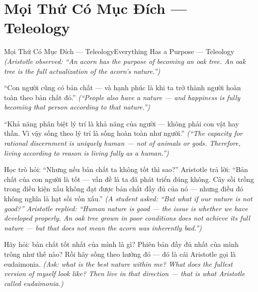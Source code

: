 \section{Mọi Thứ Có Mục Đích — Teleology}
\begin{truyen}{Mọi Thứ Có Mục Đích — Teleology}{Everything Has a Purpose — Teleology}
\textit{(Aristotle observed: ``An acorn has the purpose of becoming an oak tree. An oak tree is the full actualization of the acorn's nature.'')}

``Con người cũng có bản chất — và hạnh phúc là khi ta trở thành người hoàn toàn theo bản chất đó.''
\textit{(``People also have a nature — and happiness is fully becoming that person according to that nature.'')}

``Khả năng phân biệt lý trí là khả năng của người — không phải con vật hay thần. Vì vậy sống theo lý trí là sống hoàn toàn như người.''
\textit{(``The capacity for rational discernment is uniquely human — not of animals or gods. Therefore, living according to reason is living fully as a human.'')}

Học trò hỏi: ``Nhưng nếu bản chất ta không tốt thì sao?'' Aristotle trả lời: ``Bản chất của con người là tốt — vấn đề là ta đã phát triển đúng không. Cây sồi trồng trong điều kiện xấu không đạt được bản chất đầy đủ của nó — nhưng điều đó không nghĩa là hạt sồi vốn xấu.''
\textit{(A student asked: ``But what if our nature is not good?'' Aristotle replied: ``Human nature is good — the issue is whether we have developed properly. An oak tree grown in poor conditions does not achieve its full nature — but that does not mean the acorn was inherently bad.'')}

\end{truyen}

\begin{baihoc}
Hãy hỏi: bản chất tốt nhất của mình là gì? Phiên bản đầy đủ nhất của mình trông như thế nào? Rồi hãy sống theo hướng đó — đó là cái Aristotle gọi là eudaimonia.
\textit{(Ask: what is the best nature within me? What does the fullest version of myself look like? Then live in that direction — that is what Aristotle called eudaimonia.)}
\end{baihoc}
\ngancach

